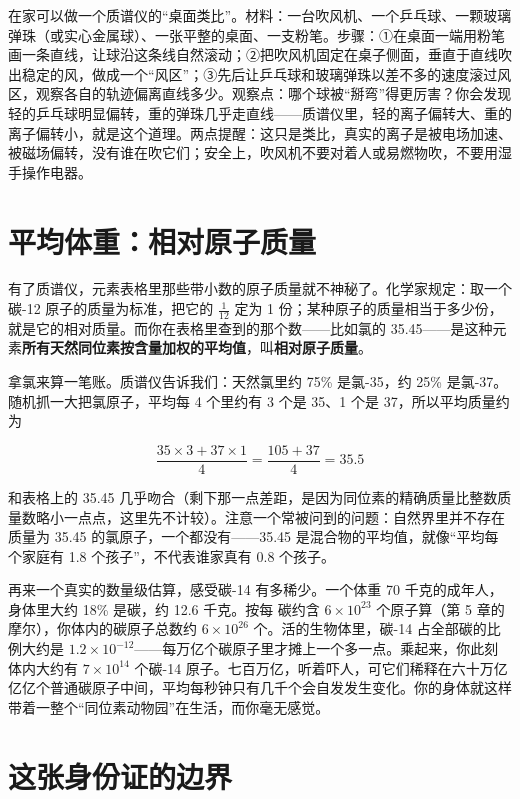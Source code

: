 \begin{shiyan}
在家可以做一个质谱仪的“桌面类比”。材料：一台吹风机、一个乒乓球、一颗玻璃弹珠（或实心金属球）、一张平整的桌面、一支粉笔。步骤：①在桌面一端用粉笔画一条直线，让球沿这条线自然滚动；②把吹风机固定在桌子侧面，垂直于直线吹出稳定的风，做成一个“风区”；③先后让乒乓球和玻璃弹珠以差不多的速度滚过风区，观察各自的轨迹偏离直线多少。观察点：哪个球被“掰弯”得更厉害？你会发现轻的乒乓球明显偏转，重的弹珠几乎走直线——质谱仪里，轻的离子偏转大、重的离子偏转小，就是这个道理。两点提醒：这只是类比，真实的离子是被电场加速、被磁场偏转，没有谁在吹它们；安全上，吹风机不要对着人或易燃物吹，不要用湿手操作电器。
\end{shiyan}

\section{平均体重：相对原子质量}

有了质谱仪，元素表格里那些带小数的原子质量就不神秘了。化学家规定：取一个碳-12 原子的质量为标准，把它的 $\frac{1}{12}$ 定为 1 份；某种原子的质量相当于多少份，就是它的相对质量。而你在表格里查到的那个数——比如氯的 35.45——是这种元素\textbf{所有天然同位素按含量加权的平均值}，叫\textbf{相对原子质量}。

\begin{qiaoliang}
拿氯来算一笔账。质谱仪告诉我们：天然氯里约 75\% 是氯-35，约 25\% 是氯-37。随机抓一大把氯原子，平均每 4 个里约有 3 个是 35、1 个是 37，所以平均质量约为

\[\frac{35\times 3 + 37\times 1}{4} = \frac{105+37}{4} = 35.5\]

和表格上的 35.45 几乎吻合（剩下那一点差距，是因为同位素的精确质量比整数质量数略小一点点，这里先不计较）。注意一个常被问到的问题：自然界里并不存在质量为 35.45 的氯原子，一个都没有——35.45 是混合物的平均值，就像“平均每个家庭有 1.8 个孩子”，不代表谁家真有 0.8 个孩子。
\end{qiaoliang}

再来一个真实的数量级估算，感受碳-14 有多稀少。一个体重 70 千克的成年人，身体里大约 18\% 是碳，约 12.6 千克。按每  碳约含 $6\times 10^{23}$ 个原子算（第 5 章的摩尔），你体内的碳原子总数约 $6\times 10^{26}$ 个。活的生物体里，碳-14 占全部碳的比例大约是 $1.2\times 10^{-12}$——每万亿个碳原子里才摊上一个多一点。乘起来，你此刻体内大约有 $7\times 10^{14}$ 个碳-14 原子。七百万亿，听着吓人，可它们稀释在六十万亿亿亿个普通碳原子中间，平均每秒钟只有几千个会自发发生变化。你的身体就这样带着一整个“同位素动物园”在生活，而你毫无感觉。

\section{这张身份证的边界}

